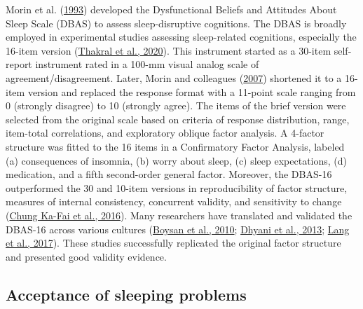 \documentclass[
  ,doc,11pt, twoside,floatsintext]{apa6}
\begin{document}
Morin et al. (\protect\hyperlink{ref-morin1993insomnia}{1993}) developed the Dysfunctional Beliefs and Attitudes About Sleep Scale (DBAS) to assess sleep-disruptive cognitions. The DBAS is broadly employed in experimental studies assessing sleep-related cognitions, especially the 16-item version (\protect\hyperlink{ref-thakral2020}{Thakral et al., 2020}). This instrument started as a 30-item self-report instrument rated in a 100-mm visual analog scale of agreement/disagreement. Later, Morin and colleagues (\protect\hyperlink{ref-morin2007a}{2007}) shortened it to a 16-item version and replaced the response format with a 11-point scale ranging from 0 (strongly disagree) to 10 (strongly agree). The items of the brief version were selected from the original scale based on criteria of response distribution, range, item-total correlations, and exploratory oblique factor analysis. A 4-factor structure was fitted to the 16 items in a Confirmatory Factor Analysis, labeled (a) consequences of insomnia, (b) worry about sleep, (c) sleep expectations, (d) medication, and a fifth second-order general factor. Moreover, the DBAS-16 outperformed the 30 and 10-item versions in reproducibility of factor structure, measures of internal consistency, concurrent validity, and sensitivity to change (\protect\hyperlink{ref-chungka-fai2016}{Chung Ka-Fai et al., 2016}). Many researchers have translated and validated the DBAS-16 across various cultures (\protect\hyperlink{ref-boysan2010}{Boysan et al., 2010}; \protect\hyperlink{ref-dhyani2013}{Dhyani et al., 2013}; \protect\hyperlink{ref-lang2017}{Lang et al., 2017}). These studies successfully replicated the original factor structure and presented good validity evidence.

\hypertarget{acceptance-of-sleeping-problems}{%
\subsection{Acceptance of sleeping problems}\label{acceptance-of-sleeping-problems}}
\end{document}
